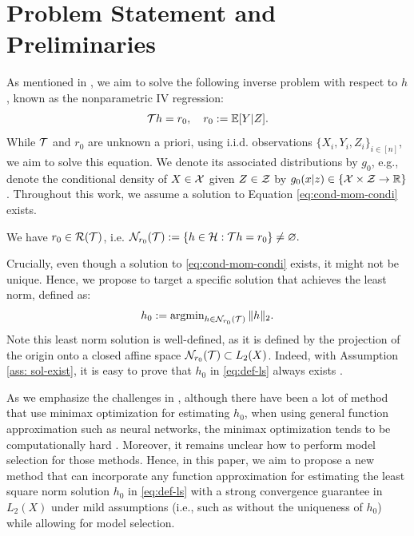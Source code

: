 \vspace{-2mm}
\section{Problem Statement and Preliminaries}
\vspace{-2mm}


As mentioned in , we aim to solve the following inverse problem with respect to $h$, known as the nonparametric IV regression:
\begin{align}\label{eq:cond-mom-condi} \textstyle 
   {\mathcal{T}} h = r_0 ,\quad r_0:= \mathbb{E}[Y|Z].  
\end{align}
While ${\mathcal{T}}$ and $r_0$ are unknown a priori, using i.i.d.  observations $\{X_i, Y_i, Z_i\}_{i\in[n]}$, we aim to solve this equation. We denote its associated distributions by $g_0$, e.g., denote the conditional density of $X\in\mathcal{X}$ given $Z\in\mathcal{Z}$ by $g_0(x|z) \in \{\mathcal{X} \times \mathcal{Z} \rightarrow \mathbb{R}\}$. 
Throughout this work, we assume a solution to Equation \eqref{eq:cond-mom-condi} exists.
\begin{assumption}\label{ass: sol-exist}
    We have $r_0 \in \mathcal{R}({\mathcal{T}})$, i.e.  $\mathcal{N}_{r_0}({\mathcal{T}}):=\{h\in \mathcal{H}: {\mathcal{T}} h = r_0\} \neq \varnothing.$
\end{assumption}
Crucially, even though a solution to \eqref{eq:cond-mom-condi} exists, it might not be unique. Hence, we propose to target a specific solution that achieves the least norm, defined as:
\begin{align}\label{eq:def-ls}\textstyle 
    h_0 := \mathop{\mathrm{argmin}}_{h\in \mathcal{N}_{r_0}({\mathcal{T}})} \|h\|_2.
\end{align}
Note this least norm solution is well-defined, as it is defined by the projection of the origin onto a closed affine space
$\mathcal{N}_{r_0}({\mathcal{T}}) \subset L_2(X)$. Indeed, with Assumption \ref{ass: sol-exist}, it is easy to prove that $h_0$ in \eqref{eq:def-ls} always exists \citep[Lemma 1]{bennett2023minimax}. 

As we emphasize the challenges in , although there have been a lot of method  that use minimax optimization for estimating $h_0$, when using general function approximation such as neural networks, the minimax optimization tends to be computationally hard \citep{lin2020near,jin2020local,lin2020gradient,diakonikolas2021efficient,razaviyayn2020nonconvex}.  Moreover, it remains unclear how to perform model selection for those methods. Hence, in this paper, we aim to propose a new method that can incorporate any function approximation for estimating the least square norm solution $h_0$ in \eqref{eq:def-ls} with a strong convergence guarantee in $L_2(X)$ under mild assumptions (i.e., such as without the uniqueness of $h_0$) while allowing for model selection. 


